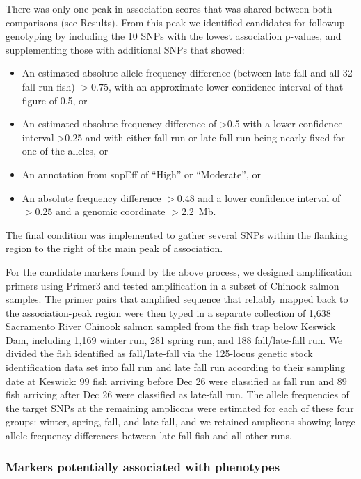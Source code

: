 There was only one peak in association scores that was shared between both comparisons (see 
Results). From this peak we identified candidates for followup genotyping by including the 10 
SNPs with the lowest association p-values, and supplementing those with additional SNPs that 
showed:
\begin{itemize}
\item An estimated absolute allele frequency difference (between late-fall and all 32 fall-run fish)  $>0.75$,  with an approximate lower confidence interval of that figure of 0.5,  or
\item An estimated absolute frequency difference of >0.5 with a lower confidence interval >0.25 and 
with either fall-run or late-fall run being nearly fixed for one of the alleles, or
\item An annotation from snpEff \citep{cingolani2012program} of “High” or “Moderate”, or
\item An absolute frequency difference $>0.48$ and a lower confidence interval of $>0.25$ and a 
genomic  coordinate $> 2.2$~Mb.
\end{itemize}
The final condition was implemented to gather several SNPs within the flanking region to the right of 
the main peak of association. 

For the candidate markers found by the above process, we designed amplification primers using 
Primer3 \citep{koressaar2007enhancements,untergasser2012primer3} and tested amplification in a 
subset of Chinook salmon 
samples. The primer pairs that amplified sequence that reliably mapped back to the association-peak region were then typed
in a separate collection of 1,638 Sacramento River Chinook salmon sampled from the fish trap below Keswick Dam, including 1,169 winter run, 281 spring 
run, and 188 fall/late-fall run. We divided the fish identified as fall/late-fall via the 125-locus genetic 
stock identification data set into fall run and late fall run according to their sampling date at Keswick: 
99 fish arriving before Dec 26 were classified as fall run and 89 fish arriving after Dec 26 were 
classified as late-fall run.   The allele frequencies of the target SNPs at the remaining amplicons 
were 
estimated for each of these four groups: winter, spring, fall, and late-fall, and we retained
amplicons showing large allele frequency  differences between late-fall fish and all other runs.


\subsubsection*{Markers potentially associated with phenotypes \citet{thompson2020complex}}

